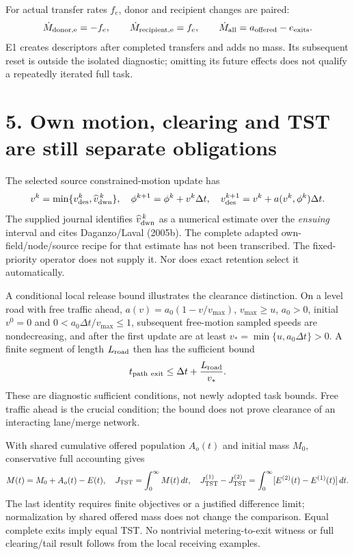 \documentclass[11pt,a4paper]{article}
\begin{document}
For actual transfer rates $f_e$, donor and recipient changes are paired:
\begin{equation}
 \dot M_{\rm donor,e}=-f_e,\qquad \dot M_{\rm recipient,e}=f_e,\qquad
 \dot M_{\rm all}=a_{\rm offered}-e_{\rm exits}.
\end{equation}
E1 creates descriptors after completed transfers and adds no mass. Its
subsequent reset is outside the isolated diagnostic; omitting its future
effects does not qualify a repeatedly iterated full task.

\section*{5. Own motion, clearing and TST are still separate obligations}
The selected source constrained-motion update has
\begin{equation}
 v^k=\min\{v_{\rm des}^k,\widehat v_{\rm dwn}^{\,k}\},\quad
 \phi^{k+1}=\phi^k+v^k\Delta t,\quad
 v_{\rm des}^{k+1}=v^k+a(v^k,\phi^k)\Delta t .
\end{equation}
The supplied journal identifies $\widehat v_{\rm dwn}^{\,k}$ as a numerical
estimate over the \emph{ensuing} interval and cites Daganzo/Laval (2005b).
The complete adapted own-field/node/source recipe for that estimate has not
been transcribed. The fixed-priority operator does not supply it. Nor does
exact retention select it automatically.

A conditional local release bound illustrates the clearance distinction.
On a level road with free traffic ahead, $a(v)=a_0(1-v/v_{\max})$,
$v_{\max}\ge u$, $a_0>0$, initial $v^0=0$ and
$0<a_0\Delta t/v_{\max}\le1$, subsequent free-motion sampled speeds are
nondecreasing, and after the first update are at least
$v_*=\min\{u,a_0\Delta t\}>0$. A finite segment of length $L_{\rm road}$ then
has the sufficient bound
\begin{equation}
 t_{\rm path\ exit}\le\Delta t+\frac{L_{\rm road}}{v_*}.
\end{equation}
These are diagnostic sufficient conditions, not newly adopted task bounds.
Free traffic ahead is the crucial condition; the bound does not prove
clearance of an interacting lane/merge network.

With shared cumulative offered population $A_o(t)$ and initial mass $M_0$,
conservative full accounting gives
\begin{equation}
 M(t)=M_0+A_o(t)-E(t),\quad
 J_{\rm TST}=\int_0^\infty M(t)\,dt,\quad
 J_{\rm TST}^{(1)}-J_{\rm TST}^{(2)}
 =\int_0^\infty[E^{(2)}(t)-E^{(1)}(t)]\,dt .
\end{equation}
The last identity requires finite objectives or a justified difference limit;
normalization by shared offered mass does not change the comparison.
Equal complete exits imply equal TST. No nontrivial metering-to-exit witness
or full clearing/tail result follows from the local receiving examples.
\end{document}
